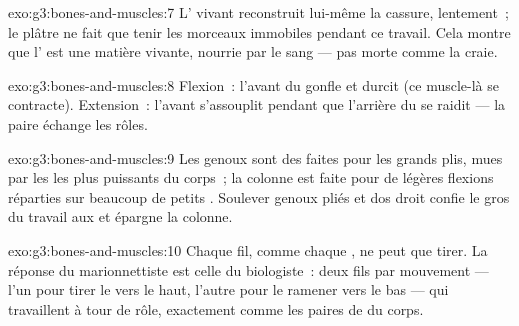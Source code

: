 \begin{solution}{exo:g3:bones-and-muscles:7}
L' vivant reconstruit lui-même la cassure, lentement~; le plâtre
ne fait que tenir les morceaux immobiles pendant ce travail. Cela
montre que l' est une matière vivante, nourrie par le sang --- pas
morte comme la craie.
\end{solution}

\begin{solution}{exo:g3:bones-and-muscles:8}
Flexion~: l'avant du  gonfle et durcit (ce muscle-là se
contracte). Extension~: l'avant s'assouplit pendant que l'arrière du
 se raidit --- la paire échange les rôles.
\end{solution}

\begin{solution}{exo:g3:bones-and-muscles:9}
Les genoux sont des  faites pour les grands plis, mues
par les  les plus puissants du corps~; la colonne est faite
pour de légères flexions réparties sur beaucoup de petits .
Soulever genoux pliés et dos droit confie le gros du travail aux
 et épargne la colonne.
\end{solution}

\begin{solution}{exo:g3:bones-and-muscles:10}
Chaque fil, comme chaque , ne peut que tirer. La réponse du
marionnettiste est celle du biologiste~: deux fils par mouvement ---
l'un pour tirer le  vers le haut, l'autre pour le ramener vers
le bas --- qui travaillent à tour de rôle, exactement comme les
paires de  du corps.
\end{solution}
